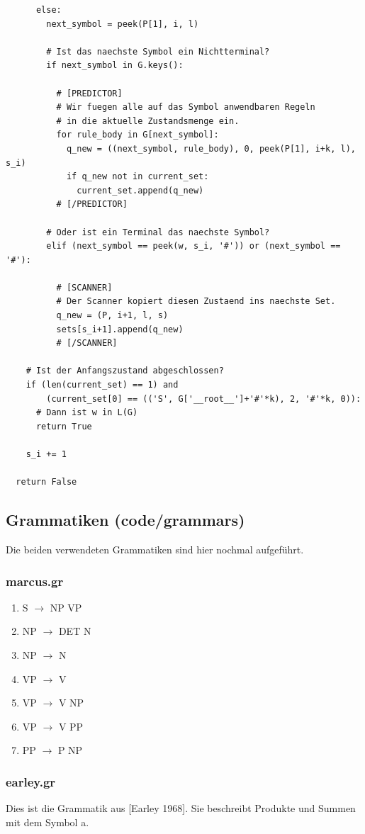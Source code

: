 \documentclass[12pt,a4paper]{article}
\theoremstyle{definition}
\begin{document}
\begin{verbatim}
      else:
        next_symbol = peek(P[1], i, l)

        # Ist das naechste Symbol ein Nichtterminal?
        if next_symbol in G.keys():

          # [PREDICTOR]
          # Wir fuegen alle auf das Symbol anwendbaren Regeln
          # in die aktuelle Zustandsmenge ein.
          for rule_body in G[next_symbol]:
            q_new = ((next_symbol, rule_body), 0, peek(P[1], i+k, l), s_i)
            if q_new not in current_set:
              current_set.append(q_new)
          # [/PREDICTOR]

        # Oder ist ein Terminal das naechste Symbol?
        elif (next_symbol == peek(w, s_i, '#')) or (next_symbol == '#'): 

          # [SCANNER]
          # Der Scanner kopiert diesen Zustaend ins naechste Set.
          q_new = (P, i+1, l, s)
          sets[s_i+1].append(q_new)
          # [/SCANNER]

    # Ist der Anfangszustand abgeschlossen?
    if (len(current_set) == 1) and
     	(current_set[0] == (('S', G['__root__']+'#'*k), 2, '#'*k, 0)):
      # Dann ist w in L(G)
      return True

    s_i += 1

  return False
		\end{verbatim}

	\subsection{Grammatiken (code/grammars)}
		Die beiden verwendeten Grammatiken sind hier nochmal aufgeführt.

		\subsubsection{marcus.gr}
			\begin{enumerate}[label={(\arabic*)}]
				\item{S $\rightarrow$ NP VP}
				\item{NP $\rightarrow$ DET N}
				\item{NP $\rightarrow$ N}
				\item{VP $\rightarrow$ V}
				\item{VP $\rightarrow$ V NP}
				\item{VP $\rightarrow$ V PP}
				\item{PP $\rightarrow$ P NP}
			\end{enumerate}
		
		\subsubsection{earley.gr}
			Dies ist die Grammatik aus [Earley 1968]. Sie beschreibt Produkte und Summen mit dem Symbol a.
			
\end{document}
